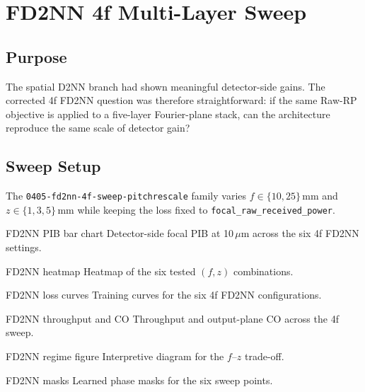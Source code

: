 \chapter{FD2NN 4f Multi-Layer Sweep}

\section{Purpose}

The spatial D2NN branch had shown meaningful detector-side gains. The corrected
4f FD2NN question was therefore straightforward: if the same Raw-RP objective is
applied to a five-layer Fourier-plane stack, can the architecture reproduce the
same scale of detector gain?

\section{Sweep Setup}

The \texttt{0405-fd2nn-4f-sweep-pitchrescale} family varies $f \in \{10, 25\}$\,mm and
$z \in \{1, 3, 5\}$\,mm while keeping the loss fixed to
\texttt{focal\_raw\_received\_power}.

  {FD2NN PIB bar chart}
  {Detector-side focal PIB at 10\,$\mu$m across the six 4f FD2NN settings.}

  {FD2NN heatmap}
  {Heatmap of the six tested $(f,z)$ combinations.}

  {FD2NN loss curves}
  {Training curves for the six 4f FD2NN configurations.}

  {FD2NN throughput and CO}
  {Throughput and output-plane CO across the 4f sweep.}

  {FD2NN regime figure}
  {Interpretive diagram for the $f$--$z$ trade-off.}

  {FD2NN masks}
  {Learned phase masks for the six sweep points.}

